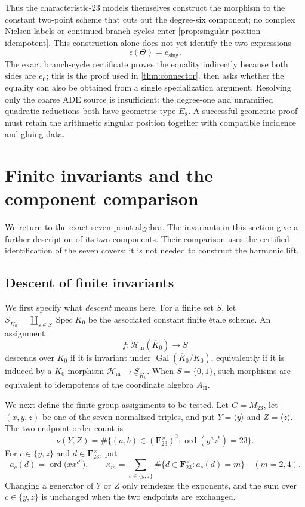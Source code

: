\documentclass[11pt]{amsart}
\theoremstyle{definition}
\theoremstyle{remark}
\newcommand{\FF}{\mathbf F}
\newcommand{\ord}{\operatorname{ord}}
\begin{document}
Thus the characteristic-$23$ models themselves construct the morphism to
the constant two-point scheme that cuts out the degree-six component; no
complex Nielsen labels or continued branch cycles enter
\cref{prop:singular-position-idempotent}.
This construction alone does not yet identify the two expressions
\[
 \epsilon(\Theta)=e_{\mathrm{sing}}.
\]
The exact branch-cycle certificate proves the equality indirectly because
both sides are $e_6$; this is the proof used in \cref{thm:connector}.
 then asks whether the equality can also be obtained from
a single specialization argument.  Resolving only the coarse ADE source is
insufficient: the degree-one and unramified quadratic reductions both have
geometric type $E_8$.  A successful geometric proof must retain the
arithmetic singular position together with compatible incidence and gluing
data.



\section{Finite invariants and the component comparison}
\label{sec:finite-comparison}

We return to the exact seven-point algebra.  The invariants in this
section give a further description of its two components.  Their
comparison uses the certified identification of the seven covers;
it is not needed to construct the harmonic lift.

\subsection{Descent of finite invariants}

We first specify what \emph{descent} means here.  For a finite set $S$, let
$\underline S_{K_0}=\coprod_{s\in S}\operatorname{Spec}K_0$ be the
associated constant finite étale scheme.  An assignment
\[
 f:\mathcal H_{\mathrm{in}}(\overline K_0)\longrightarrow S
\]
descends over $K_0$ if it is invariant under
$\operatorname{Gal}(\overline K_0/K_0)$, equivalently if it is induced by a
$K_0$-morphism
$\mathcal H_{\mathrm{in}}\to\underline S_{K_0}$.  When
$S=\{0,1\}$, such morphisms are equivalent to idempotents of the coordinate
algebra $A_{\mathrm H}$.

We next define the finite-group assignments to be tested.  Let $G=M_{23}$,
let $(x,y,z)$ be one of the seven normalized triples, and put
$Y=\langle y\rangle$ and $Z=\langle z\rangle$.  The two-endpoint order
count is
\[
 \nu(Y,Z)=\#\bigl\{(a,b)\in(\FF_{23}^{\times})^2:
                 \ord(y^az^b)=23\bigr\}.
\]
For $c\in\{y,z\}$ and $d\in\FF_{23}^{\times}$, put
\[
 a_c(d)=\ord\bigl(xx^{c^d}\bigr),\qquad
 \kappa_m=\sum_{c\in\{y,z\}}
   \#\{d\in\FF_{23}^{\times}:a_c(d)=m\}\quad(m=2,4).
\]
Changing a generator of $Y$ or $Z$ only reindexes the exponents, and the
sum over $c\in\{y,z\}$ is unchanged when the two endpoints are exchanged.
\end{document}
